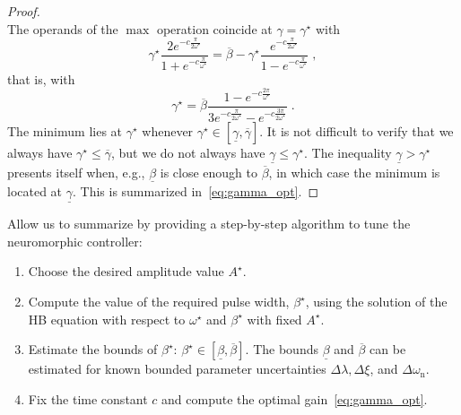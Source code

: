 \documentclass{article}
\newcommand{\rn}{\mathrm{n}}
\newcommand{\opt}{\mathrm{opt}}
\theoremstyle{definition}
\theoremstyle{remark}
\begin{document}
\begin{proof}
\begin{displaymath}
    \end{displaymath}
    The operands of the $\max$ operation coincide at $\gamma = \gamma^\star$ with
    \begin{displaymath}
        \gamma^\star \frac{2e^{-c\frac{\pi}{2\omega^\star}}}{1 + e^{-c\frac{\pi}{\omega^\star}}} = \overline{\beta} - \gamma^\star\frac{e^{-c\frac{\pi}{2\omega^\star}}}{1 - e^{-c\frac{\pi}{\omega^\star}}} \;,
    \end{displaymath}
    that is, with
    \begin{displaymath}
        \gamma^\star = \overline{\beta} \frac{1 - e^{-c\frac{2\pi}{\omega^\star}}}{3e^{-c\frac{\pi}{2\omega^\star}} - e^{-c\frac{3\pi}{2\omega^\star}}} \;.
    \end{displaymath}
    The minimum lies at $\gamma^\star$ whenever $\gamma^\star \in [\underline{\gamma},\overline{\gamma}]$.
    It is not difficult to verify that we always have $\gamma^\star \le \overline{\gamma}$, but we do not always have $\underline{\gamma} \le \gamma^\star$. The inequality $\underline{\gamma} > \gamma^\star$ presents itself when, e.g., $\underline{\beta}$ is close enough to $\overline{\beta}$, in which case the minimum is located at $\underline{\gamma}$. This is summarized in~\eqref{eq:gamma_opt}.
\end{proof}

Allow us to summarize by providing a step-by-step algorithm to tune the neuromorphic controller:
\begin{enumerate}
    \item Choose the desired amplitude value $A^\star$.
    \item Compute the value of the required pulse width, $\beta^\star$, using the solution of the HB equation with respect to $\omega^\star$ and $\beta^\star$ with fixed $A^\star$.
    \item Estimate the bounds of $\beta^\star$: $\beta^\star \in [\underline{\beta}, \overline{\beta}]$. The bounds $\underline{\beta}$ and $\overline{\beta}$ can be estimated for known bounded parameter uncertainties $\Delta\lambda, \Delta\xi$, and $\Delta\omega_\rn$. %
    \item Fix the time constant $c$ and compute the optimal gain~\eqref{eq:gamma_opt}.
\end{enumerate}
\end{document}
